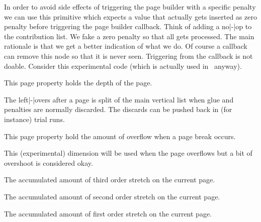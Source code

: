 In order to avoid side effects of triggering the page builder with a specific
penalty we can use this primitive which expects a value that actually gets
inserted as zero penalty before triggering the page builder callback. Think of
adding a no|-|op to the contribution list. We fake a zero penalty so that all
gets processed. The main rationale is that we get a better indication of what we
do. Of course a callback can remove this node so that it is never seen.
Triggering from the callback is not doable. Consider this experimental code
(which is actually used in \CONTEXT\ anyway).

\stopnewprimitive

\startnewprimitive[title={\prm {pagedepth}}]

This page property holds the depth of the page.

\stopnewprimitive

\startoldprimitive[title={\prm {pagediscards}}]

The left|-|overs after a page is split of the main vertical list when glue and
penalties are normally discarded. The discards can be pushed back in (for
instance) trial runs.

\stopoldprimitive

\startnewprimitive[title={\prm {pageexcess}}]

This page property hold the amount of overflow when a page break occurs.

\stopnewprimitive

\startnewprimitive[title={\prm {pageextragoal}}]

This (experimental) dimension will be used when the page overflows but a bit of
overshoot is considered okay.

\stopnewprimitive

\startoldprimitive[title={\prm {pagefilllstretch}}]

The accumulated amount of third order stretch on the current page.

\stopoldprimitive

\startoldprimitive[title={\prm {pagefillstretch}}]

The accumulated amount of second order stretch on the current page.

\stopoldprimitive

\startoldprimitive[title={\prm {pagefilstretch}}]

The accumulated amount of first order stretch on the current page.

\stopoldprimitive

